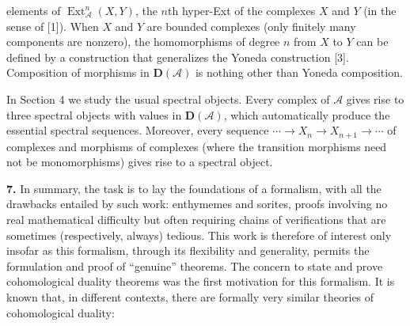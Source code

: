 %
elements of $\operatorname{Ext}_{\mathcal A}^{n}(X,Y)$, the $n$th
hyper-Ext of the complexes $X$ and $Y$ (in the sense of [1]). When $X$ and
$Y$ are bounded complexes (only finitely many components are nonzero), the
homomorphisms of degree $n$ from $X$ to $Y$ can be defined by a construction
that generalizes the Yoneda construction [3]. Composition of morphisms in
$\mathbf D(\mathcal A)$ is nothing other than Yoneda composition.

In Section 4 we study the usual spectral objects. Every complex of
$\mathcal A$ gives rise to three spectral objects with values in
$\mathbf D(\mathcal A)$, which automatically produce the essential spectral
sequences. Moreover, every sequence
$\cdots\to X_n\to X_{n+1}\to\cdots$ of complexes and morphisms of
complexes (where the transition morphisms need not be monomorphisms) gives
rise to a spectral object.

\noindent\textbf{7.}\quad
In summary, the task is to lay the foundations of a formalism, with all the
drawbacks entailed by such work: enthymemes and sorites, proofs involving no
real mathematical difficulty but often requiring chains of verifications
that are sometimes (respectively, always) tedious. This work is therefore of
interest only insofar as this formalism, through its flexibility and
generality, permits the formulation and proof of “genuine” theorems. The
concern to state and prove cohomological duality theorems was the first
motivation for this formalism. It is known that, in different contexts, there
are formally very similar theories of cohomological duality:

